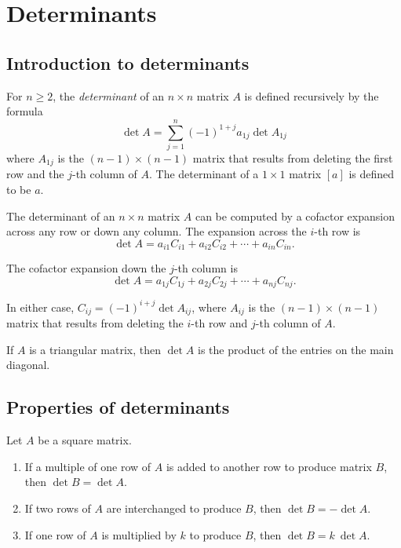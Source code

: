 \documentclass{article}
\begin{document}
\section{Determinants}

\subsection{Introduction to determinants}

\begin{defn}
    For \(n \geq 2\), the \emph{determinant} of an \(n \times n\) matrix \(A\) is defined recursively by the formula
\[
    \det A = \sum_{j=1}^n (-1)^{1+j} a_{1j} \det A_{1j}
\]
where \(A_{1j}\) is the \((n-1) \times (n-1)\) matrix that results from deleting the first row and the \(j\)-th column of \(A\). The determinant of a \(1 \times 1\) matrix \([a]\) is defined to be \(a\).
\end{defn}

\begin{thm} 
    The determinant of an \(n\times n\) matrix \(A\) can be computed by a cofactor expansion across any row or down any column. The expansion across the \(i\)-th row is 
    \[
        \det A=a_{i1}C_{i1}+a_{i2}C_{i2}+\cdots+a_{in}C_{in}.
    \] 
    
    The cofactor expansion down the \(j\)-th column is 
    \[
        \det A=a_{1j}C_{1j}+a_{2j}C_{2j}+\cdots+a_{nj}C_{nj}.
    \]

    In either case, \(C_{ij}=(-1)^{i+j}\det A_{ij}\), where \(A_{ij}\) is the \((n-1)\times(n-1)\) matrix that results from deleting the \(i\)-th row and \(j\)-th column of \(A\).
\end{thm}

\begin{thm}
    If \(A\) is a triangular matrix, then \(\det A\) is the product of the entries on the main diagonal.
\end{thm}

\subsection{Properties of determinants}

\begin{thm} 
    Let \(A\) be a square matrix.
    \begin{enumerate}
        \item[a.] If a multiple of one row of \(A\) is added to another row to produce matrix \(B\), then \(\det B=\det A\).
        \item[b.] If two rows of \(A\) are interchanged to produce \(B\), then \(\det B=-\det A\).
        \item[c.] If one row of \(A\) is multiplied by \(k\) to produce \(B\), then \(\det B=k\ \det A\).
    \end{enumerate}
\end{thm}
\end{document}
